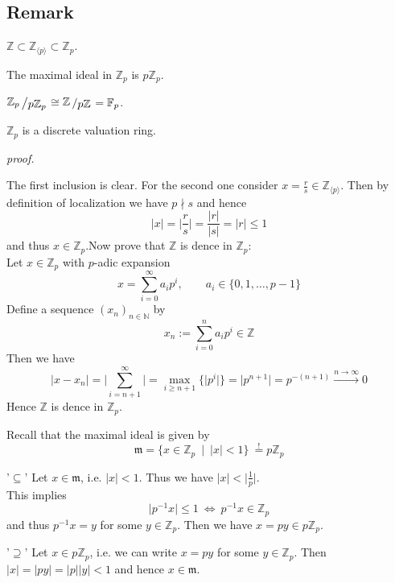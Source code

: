 \documentclass[12pt]{book}
\newcommand{\slant}[2]{{\raisebox{.1em}{$#1$}\left/\raisebox{-.1em}{$#2$}\right.}}
\begin{document}
\begin{spacing}{1.3}
\subsection{Remark}%
\begin{compactenum}
\item $\mathbb{Z} \subset \mathbb{Z}_{\langle p\rangle} \subset \mathbb{Z}_p$.
\item The maximal ideal in $\mathbb{Z}_p$ is $p\mathbb{Z}_p$.
\item $\slant{\mathbb{Z}_p}{p\mathbb{Z}_p} \cong \slant{\mathbb{Z}}{p\mathbb{Z}} =\mathbb{F}_p$.
\item $\mathbb{Z}_p$ is a discrete valuation ring. 
\end{compactenum}
\textit{proof.}
\begin{compactenum}
\item The first inclusion is clear. For the second one consider $x =\frac{r}{s} \in \mathbb{Z}_{\langle p \rangle}$. Then by definition of localization we have $p \nmid s$ and hence
$$\vert x \vert=\Big\vert \frac{r}{s}\Big\vert=\frac{|r|}{|s|}=|r|\leqslant 1$$
and thus $x\in \mathbb{Z}_{p}$.Now prove that $\mathbb{Z}$ is dence in $\mathbb{Z}_p$:\\
Let $x \in \mathbb{Z}_p$ with $p$-adic expansion
$$x=\sum_{i=0}^{\infty}a_i p^{i}, \qquad a_i \in \{0,1, \ldots, p-1\}$$
Define a sequence $(x_n)_{n \in \mathbb{N}}$ by
$$x_n:=\sum_{i=0}^n a_i p^{i} \in \mathbb{Z}$$
Then we have
$$\vert x-x_n\vert =\Big\vert \sum_{i=n+1}^{\infty}\Big\vert = \max_{i\geqslant n+1}\{\vert p^{i} \vert \}=\big\vert p^{n+1} \big\vert =p^{-(n+1)} \xrightarrow{n \to \infty} 0 $$
Hence $\mathbb{Z}$ is dence in $\mathbb{Z}_p$. 
\item Recall that the maximal ideal is given by
$$\mathfrak{m}=\{x \in \mathbb{Z}_p \ \mid \ |x|<1 \} \ \overset{!}{=} p \mathbb{Z}_p$$
\begin{compactenum}
\item['$\subseteq$'] Let $x \in \mathfrak{m}$, i.e. $|x|<1$. Thus we have $|x|< \big\vert \frac{1}{p} \big\vert$.\\
This implies
$$\vert p^{-1}  x \vert \leqslant 1 \ \Longleftrightarrow \ p^{-1} x \in \mathbb{Z}_p$$
and thus $p^{-1}x = y$ for some $y \in \mathbb{Z}_p$. Then we have $x=p y \in p\mathbb{Z}_p$.
\item['$\supseteq$'] Let $x \in p\mathbb{Z}_p$, i.e. we can write $x=py$ for some $y \in \mathbb{Z}_p$. Then \\
$|x|=|py|=|p||y|<1$ and hence $x\in \mathfrak{m}$.
\end{compactenum}

\end{compactenum}
\end{spacing}
\end{document}
